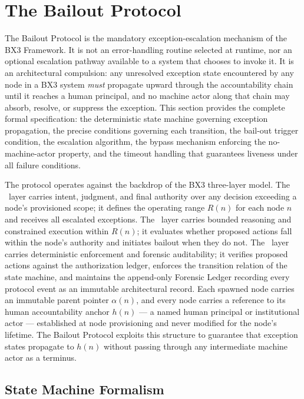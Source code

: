 \section{The Bailout Protocol}\label{sec:bailout}

The Bailout Protocol is the mandatory exception-escalation mechanism of the BX3 Framework. It is not an error-handling routine selected at runtime, nor an optional escalation pathway available to a system that chooses to invoke it. It is an architectural compulsion: any unresolved exception state encountered by any node in a BX3 system \emph{must} propagate upward through the accountability chain until it reaches a human principal, and no machine actor along that chain may absorb, resolve, or suppress the exception. This section provides the complete formal specification: the deterministic state machine governing exception propagation, the precise conditions governing each transition, the bail-out trigger condition, the escalation algorithm, the bypass mechanism enforcing the no-machine-actor property, and the timeout handling that guarantees liveness under all failure conditions.

The protocol operates against the backdrop of the BX3 three-layer model. The \purpose\ layer carries intent, judgment, and final authority over any decision exceeding a node's provisioned scope; it defines the operating range $R(n)$ for each node $n$ and receives all escalated exceptions. The \bounds\ layer carries bounded reasoning and constrained execution within $R(n)$; it evaluates whether proposed actions fall within the node's authority and initiates bailout when they do not. The \fact\ layer carries deterministic enforcement and forensic auditability; it verifies proposed actions against the authorization ledger, enforces the transition relation of the state machine, and maintains the append-only Forensic Ledger recording every protocol event as an immutable architectural record. Each spawned node carries an immutable parent pointer $\alpha(n)$, and every node carries a reference to its human accountability anchor $h(n)$ — a named human principal or institutional actor — established at node provisioning and never modified for the node's lifetime. The Bailout Protocol exploits this structure to guarantee that exception states propagate to $h(n)$ without passing through any intermediate machine actor as a terminus.

\subsection{State Machine Formalism}\label{sec:state-machine}

